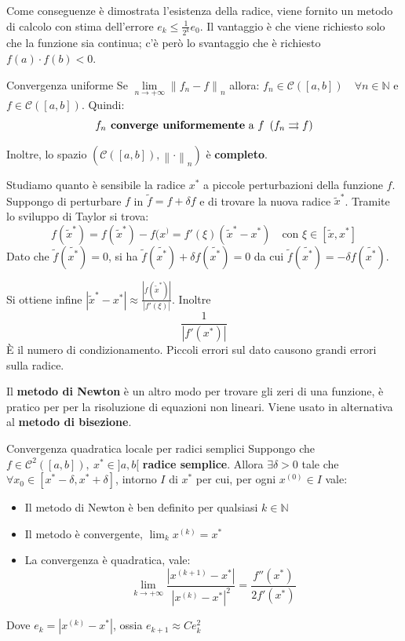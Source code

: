 \documentclass{article}
\begin{document}
Come conseguenze è dimostrata l'esistenza della radice, viene fornito un metodo di calcolo con stima dell'errore $e_k\le\frac{1}{2^k}e_0$. Il vantaggio è
che viene richiesto solo che la funzione sia continua; c'è però lo svantaggio che è richiesto $f(a)\cdot f(b)<0$.

\begin{defi}{Convergenza uniforme}{}
    Se $\underset{n\to+\infty}{\lim} \left\|f_n-f\right\|_n$ allora:
    $f_n\in \mathcal{C}\left([a,b]\right)\quad \forall n\in\mathbb N$ e $f\in\mathcal{C}\left([a,b]\right)$. Quindi:
    \[f_n \text{\textbf{ converge uniformemente} a }  f\ \left(f_n\rightrightarrows f\right)\]

    Inoltre, lo spazio $\left(\mathcal{C}\left([a,b]\right),\left\|\cdot\right\|_n\right)$ è \textbf{completo}.

\end{defi}

Studiamo quanto è sensibile la radice $x^*$ a piccole perturbazioni della funzione $f$.\\
Suppongo di perturbare $f$ in $\widetilde{f}=f+\delta f$ e di trovare la nuova radice $\widetilde{x}^*$.
Tramite lo sviluppo di Taylor si trova:
\[f(\widetilde{x}^*) = f(\widetilde{x}^*) - f(x^) = f'(\xi)(\widetilde{x}^* - x^*)\quad\text{con }\xi\in[\widetilde{x},x^*]\]
Dato che $\widetilde{f}\left(\widetilde{x^*}\right)=0$, si ha $\widetilde{f}\left(\widetilde{x^*}\right)+\delta f\left(\widetilde{x^*}\right)=0$ da cui $\widetilde{f}\left(\widetilde{x^*}\right)=-\delta f\left(\widetilde{x^*}\right)$.

Si ottiene infine $|\widetilde{x}^* - x^*| \approx \frac{|f(\widetilde{x}^*)|}{|f'(\xi)|}$. Inoltre
\[\boxed{\frac{1}{\left|f'(x^*)\right|}}\]
È il numero di condizionamento. Piccoli errori sul dato causono grandi errori sulla radice.

Il \textbf{metodo di Newton} è un altro modo per trovare gli zeri di una funzione, è pratico per per la
risoluzione di equazioni non lineari. Viene usato in alternativa al \textbf{metodo di bisezione}.

\begin{theo}{Convergenza quadratica locale per radici semplici}{}
    Suppongo che $f\in\mathcal{C}^2\left([a,b]\right),\ x^*\in]a,b[$ \textbf{radice semplice}. Allora
    $\exists\delta>0$ tale che $\forall x_0\in[x^*-\delta, x^*+\delta]$, intorno $I$ di $x^*$ per cui, per ogni $x^{(0)}\in I$ vale:\\
    \begin{itemize}
        \item Il metodo di Newton è ben definito per qualsiasi $k\in\mathbb N$ 
        \item Il metodo è convergente, \large$\lim_kx^{(k)}= x^*$\normalsize
        \item La convergenza è quadratica, vale:
        \[\underset{k\to+\infty}{\lim}\frac{\left|x^{(k+1)}-x^*\right|}{\left|x^{(k)}-x^*\right|^2}=\frac{f''(x^*)}{2f'(x^*)}\]
    \end{itemize}
    Dove $e_k=\left|x^{(k)}-x^*\right|$, ossia $e_{k+1}\approx Ce_k^2$
\end{theo}
\end{document}
